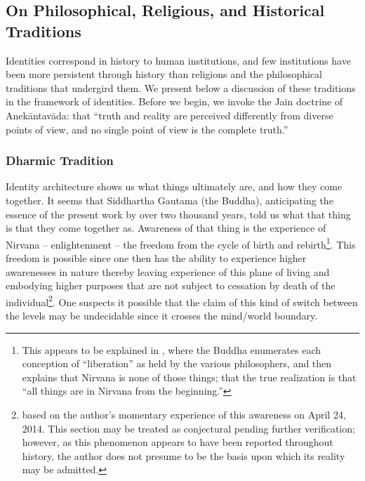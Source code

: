 \documentclass[pra,twocolumn,groupedaddress,10pt]{revtex4}
\theoremstyle{definition}
\begin{document}

\subsection{On Philosophical, Religious, and Historical Traditions} \label{sec:phirelhistra}

Identities correspond in history to human institutions, and few institutions have been more persistent through history than religions and the philosophical traditions that undergird them. We present below a discussion of these traditions in the framework of identities. Before we begin, we invoke the Jain doctrine of Anek\={a}ntav\={a}da: that ``truth and reality are perceived differently from diverse points of view, and no single point of view is the complete truth.''\cite{anekantavada}

\subsubsection{Dharmic Tradition} \label{sec:dhatra}

Identity architecture shows us what things ultimately are, and how they come together. It seems that Siddhartha Gautama (the Buddha), anticipating the essence of the present work by over two thousand years, told us what that thing is that they come together as. Awareness of that thing is the experience of Nirvana -- enlightenment -- the freedom from the cycle of birth and rebirth\footnote{This appears to be explained in \cite{lankavatara}, where the Buddha enumerates each conception of ``liberation'' as held by the various philosophers, and then explains that Nirvana is none of those things; that the true realization is that ``all things are in Nirvana from the beginning.''}. This freedom is possible since one then has the ability to experience higher awarenesses in nature thereby leaving experience of this plane of living and embodying higher purposes that are not subject to cessation by death of the individual\footnote{based on the author's momentary experience of this awareness on April 24, 2014. This section may be treated as conjectural pending further verification; however, as this phenomenon appears to have been reported throughout history, the author does not presume to be the basis upon which its reality may be admitted.}. One suspects it possible that the claim of this kind of switch between the levels may be undecidable since it crosses the mind/world boundary.
\end{document}
